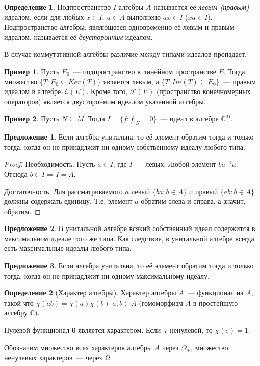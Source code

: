 \documentclass[12pt]{extarticle}
\theoremstyle{definition}
\newtheorem{definition}{\indent Определение}[section]
\newtheorem*{example}{\indent Пример}%
\newtheorem{suggestion}{\indent Предложение}[section]
\newcommand{\bb}[1]{\mathbb{#1}}
\begin{document}
        \begin{definition} \label{def: ideal}
        Подпространство $I$ алгебры $A$ называется её \textit{левым (правым)} идеалом, если для любых $x \in I,\ a \in A$ выполнено $ax \in I$ ($xa \in I$). Подпространство алгебры, являющееся одновременно её левым и правым идеалом, называется её \textit{двусторонним} идеалом.
    \end{definition}
    В случае коммутативной алгебры различие между типами идеалов пропадает.
    \begin{example}
        Пусть $E_0$~--- подпространство в линейном пространстве $E$. Тогда множество $\{T : E_0 \subseteq Ker(T)\}$ является левым, а $\{T: Im(T) \subseteq E_0\}$~--- правым идеалом в алгебре $\mathcal{L}(E)$. Кроме того, $\mathcal{F}(E)$ (пространство конечномерных операторов) является двусторонним идеалом указанной алгебры.
    \end{example}
    \begin{example}
        Пусть $N \subseteq M$. Тогда $I = \{f: f|_N = 0\}$~--- идеал в алгебре $\mathds{C}^M$.
    \end{example}
    \begin{suggestion}
        Если алгебра унитальна, то её элемент обратим тогда и только тогда, когда он не принадлжит ни одному собственному идеалу любого типа.
    \end{suggestion}
    \begin{proof}
    Необходимость. Пусть $a \in I$, где $I$~--- левых. Любой элемент $ba^{-1}a$. Отсюда $b \in I \Rightarrow I = A$.

    Достаточность. Для рассматриваемого $a$ левый $\{ba: b \in A\}$ и правый $\{ab: b \in A\}$ должны содержать единицу. Т.е. элемент $a$ обратим слева и справа, а значит, обратим.
    \end{proof}
   \begin{suggestion}
        В унитальной алгебре всякий собственный идеал содержится в максимальном идеале того же типа. Как следствие, в унитальной алгебре всегда есть максимальные идеалы любого типа.
    \end{suggestion}

    \begin{suggestion}
    Если алгебра унитальна, то её элемент обратим тогда и только тогда, когда он не принадлжит ни одному максимальному идеалу.
    \end{suggestion}

    \begin{definition}[Характер алгебры]\label{def:Algerbra char}
        Характер алгебры $A$~--- функционал на $A$, такой что $\chi(ab) = \chi(a)\chi(b)$ $a,b \in A$ (гомоморфизм $A$ в простейшую алгебру $\bb{C}$).
    \end{definition}
    Нулевой функционал \textbf{0} является характером. Если $\chi$ ненулевой, то $\chi(e) = 1$.
    \par Обозначим множество всех характеров алгебры $A$ через $\Omega_+$, множество ненулевых характеров~--- через $\Omega$.
\end{document}
